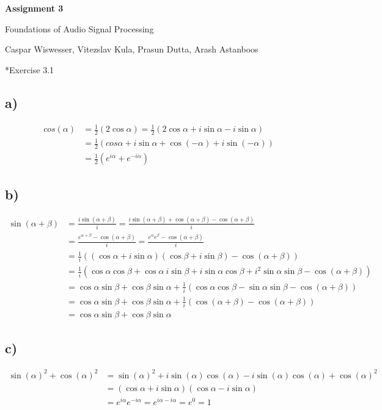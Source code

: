\documentclass{article} %
\newcommand{\maketitletwo}[2][]{\begin{center}
        \Large{\textbf{Assignment 3}
            
            Foundations of Audio Signal Processing} %
        \vspace{5pt}
        
        \normalsize{Caspar Wiswesser, Vitezslav Kula, Prasun Dutta, Arash Astanboos %
        }
        \vspace{15pt}
        
\end{center}}
\begin{document}
    \maketitletwo[1]  %
    
    \section*{Exercise 3.1}
    \subsection*{a)}

    \begin{align*}
        cos(\alpha) &= \frac{1}{2} (2\cos\alpha) = \frac{1}{2} (2\cos\alpha + i \sin\alpha - i \sin\alpha) \\
        &= \frac{1}{2} (cos\alpha + i \sin\alpha + \cos(-\alpha) + i \sin(-\alpha)) \\
        &= \frac{1}{2} (e^{i \alpha} + e^{-i \alpha})
    \end{align*}

    \subsection*{b)}
    
    \begin{align*}
        \sin(\alpha + \beta) &= \frac{i \sin(\alpha + \beta)}{i} = \frac{i \sin(\alpha + \beta) + \cos(\alpha + \beta) - \cos(\alpha + \beta)}{i} \\
        &= \frac{e^{\alpha + \beta} - \cos(\alpha + \beta)}{i} = \frac{e^\alpha e^\beta - \cos(\alpha + \beta)}{i} \\
        &= \frac{1}{i} ((\cos\alpha + i \sin\alpha)(\cos\beta + i \sin\beta) - \cos(\alpha + \beta)) \\
        &= \frac{1}{i} (\cos\alpha \cos\beta + \cos \alpha ~ i \sin\beta + i \sin\alpha \cos\beta + i^2 \sin\alpha \sin\beta - \cos(\alpha + \beta)) \\
        &= \cos \alpha \sin \beta + \cos \beta \sin \alpha + \frac{1}{i} (\cos \alpha \cos \beta - \sin \alpha \sin \beta - \cos(\alpha + \beta)) \\
        &= \cos \alpha \sin \beta + \cos \beta \sin \alpha + \frac{1}{i} (\cos(\alpha + \beta) - \cos(\alpha + \beta)) \\
        &= \cos \alpha \sin \beta + \cos \beta \sin \alpha
    \end{align*}

    \subsection*{c)}

    \begin{align*}
        \sin(\alpha)^2 + \cos(\alpha)^2 &= \sin(\alpha)^2 + i \sin(\alpha)\cos(\alpha) - i \sin(\alpha)\cos(\alpha) + \cos(\alpha)^2 \\
        &= (\cos\alpha + i \sin\alpha)(\cos\alpha - i \sin\alpha) \\
        &= e^{i \alpha} e^{-i \alpha} = e^{i \alpha - i \alpha} = e^0 = 1
    \end{align*}

    
\end{document}
